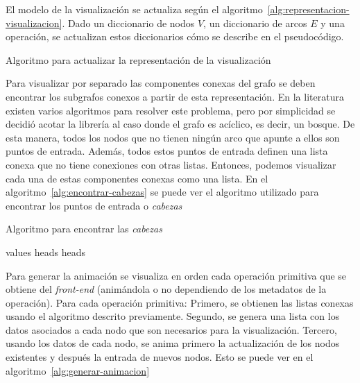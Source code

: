 El modelo de la visualización se actualiza según el algoritmo~\ref{alg:representacion-visualizacion}. Dado un diccionario de nodos $V$, un diccionario de arcos $E$ y una operación, se actualizan estos diccionarios cómo se describe en el pseudocódigo.

\begin{algorithm}[htb]
  \caption{Algoritmo para actualizar la representación de la visualización}
  \label{alg:representacion-visualizacion}
  \begin{algorithmic}[1]
      \State {}
      \State {}
      \State {}
      \State {}
    \EndIf
  \EndFunction
  \end{algorithmic}
\end{algorithm}

Para visualizar por separado las componentes conexas del grafo se deben encontrar los subgrafos conexos a partir de esta representación. En la literatura existen varios algoritmos para resolver este problema, pero por simplicidad se decidió acotar la librería al caso donde el grafo es acíclico, es decir, un bosque. De esta manera, todos los nodos que no tienen ningún arco que apunte a ellos son puntos de entrada. Además, todos estos puntos de entrada definen una lista conexa que no tiene conexiones con otras listas. Entonces, podemos visualizar cada una de estas componentes conexas como una lista. En el algoritmo~\ref{alg:encontrar-cabezas} se puede ver el algoritmo utilizado para encontrar los puntos de entrada o \textit{cabezas}

\begin{algorithm}[htb]
  \caption{Algoritmo para encontrar las \textit{cabezas}}
  \label{alg:encontrar-cabezas}
  \begin{algorithmic}[1]
    \State values \gets {}
    \State heads \gets {} 
    \State \Return heads
  \EndFunction
  \end{algorithmic}
\end{algorithm}

Para generar la animación se visualiza en orden cada operación primitiva que se obtiene del \textit{front-end} (animándola o no dependiendo de los metadatos de la operación). Para cada operación primitiva: Primero, se obtienen las listas conexas usando el algoritmo descrito previamente. Segundo, se genera una lista con los datos asociados a cada nodo que son necesarios para la visualización. Tercero, usando los datos de cada nodo, se anima primero la actualización  de los nodos existentes y después la entrada de nuevos nodos. Esto se puede ver en el algoritmo~\ref{alg:generar-animacion} 

